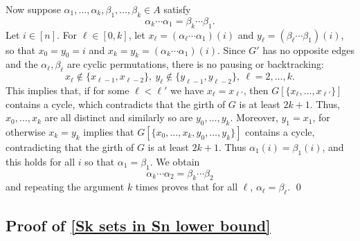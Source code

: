 \documentclass[12pt]{article}
\begin{document}
    Now suppose $\alpha_1,\ldots,\alpha_k,\beta_1,\ldots,\beta_k\in A$ satisfy
    $$\alpha_k\cdots\alpha_1=\beta_k\cdots\beta_1.$$
    Let $i\in [n]$. For $\ell\in[0,k]$, let $x_\ell=(\alpha_\ell\cdots\alpha_1)(i)$ and $y_\ell=(\beta_\ell\cdots\beta_1)(i)$, so that $x_0=y_0=i$ and $x_k=y_k=(\alpha_k\cdots\alpha_1)(i).$ Since $G'$ has no opposite edges and the $\alpha_\ell,\beta_\ell$ are cyclic permutations, there is no pausing or backtracking:
    $$x_\ell\not\in\{x_{\ell-1},x_{\ell-2}\},\ y_\ell\not\in\{ y_{\ell-1},y_{\ell-2}\},\ \ell=2,\ldots,k.$$
    This implies that, if for some $\ell<\ell'$ we have $x_\ell=x_{\ell'}$, then $G[\{x_\ell,\ldots,x_{\ell'}\}]$ contains a cycle, which contradicts that the girth of $G$ is at least $2k+1$. Thus, $x_0,\ldots,x_k$ are all distinct and similarly so are $y_0,\ldots,y_k$. Moreover, $y_1=x_1$, for otherwise $x_k=y_k$ implies that $G[\{x_0,\ldots,x_k,y_0,\ldots,y_k\}]$ contains a cycle, contradicting that the girth of $G$ is at least $2k+1$. Thus $\alpha_1(i)=\beta_1(i)$, and this holds for all $i$ so that $\alpha_1=\beta_1$. We obtain
    $$\alpha_k\cdots\alpha_2=\beta_k\cdots\beta_2$$
    and repeating the argument $k$ times proves that for all $\ell$, $\alpha_\ell=\beta_\ell$.
\qed

\subsection{Proof of \autoref{Sk sets in Sn lower bound}}
\end{document}
